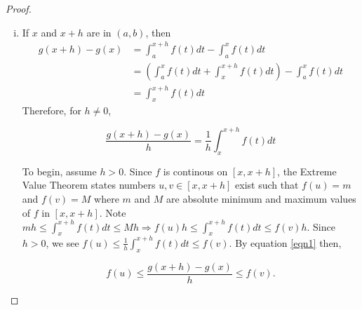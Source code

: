 \documentclass[a4paper,11pt]{article}
\begin{document}
\begin{outline}
    \begin{proof}
      \begin{enumerate}[i.]
        \item 
          If \(x\) and \(x+h\) are in \((a, b)\), then 
          \begin{align*}
            g(x+h)-g(x)&=\int_a^{x+h}f(t)dt-\int_a^xf(t)dt\\
                       &=\left(\int_a^xf(t)dt + \int_x^{x+h}f(t)dt\right)-\int_a^{x}f(t)dt\\
                       &=\int_x^{x+h}f(t)dt
          \end{align*}
          Therefore, for \(h \neq 0\), 
          
          \begin{equation} 
            \label{eqn1}
            \frac{g(x+h)-g(x)}{h} = \frac{1}{h}\int_x^{x+h}f(t)dt
          \end{equation}
          
          To begin, assume \(h > 0\). Since \(f\) is continous on \([x, x+h]\), the Extreme Value Theorem states
          numbers \(u, v\in [x, x+h]\) exist such that \(f(u)=m\) and \(f(v)=M\) where \(m\) and \(M\) are absolute
          minimum and maximum values of \(f\) in \([x, x+h]\). Note \(mh \leq \int_x^{x+h}f(t)dt \leq Mh 
          \Rightarrow f(u)h \leq\int_x^{x+h}f(t)dt \leq f(v)h\). Since \(h > 0\), we see \(f(u) \leq 
          \frac{1}{h}\int_x^{x+h}f(t)dt \leq f(v)\). By equation \eqref{eqn1} then,
          
          \begin{equation}
            \label{eqn2}
            f(u) \leq \frac{g(x+h)-g(x)}{h} \leq f(v)\text{.}
          \end{equation}
          

\end{enumerate}
\end{proof}
\end{outline}
\end{document}

